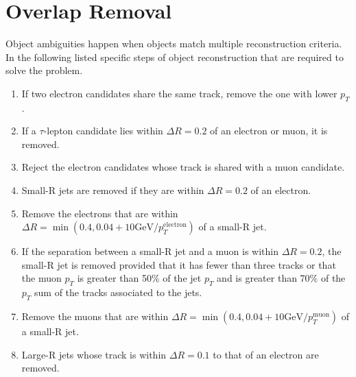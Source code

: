 \documentclass[class=NCU_thesis, crop=false]{standalone}
\begin{document}
\section{Overlap Removal}\label{OR}
	Object ambiguities happen when objects match multiple reconstruction criteria. In the following listed specific steps of object reconstruction that are required to solve the problem.
	\begin{enumerate}
		\item If two electron candidates share the same track, remove the one with lower $p_T$.
		\item If a $\tau$-lepton candidate lies within $\Delta R = 0.2$ of an electron or muon, it is removed.
		\item Reject the electron candidates whose track is shared with a muon candidate.
		\item Small-R jets are removed if they are within $\Delta R = 0.2$ of an electron.
		\item Remove the electrons that are within $\Delta R = \min(0.4, 0.04 + 10 \mathrm{GeV} / p_T^{\mathrm{electron}})$ of a small-R jet.
		\item If the separation between a small-R jet and a muon is within $\Delta R = 0.2$, the small-R jet is removed provided that it has fewer than three tracks or that the muon $p_T$ is greater than 50\% of the jet $p_T$ and is greater than 70\% of the $p_T$ sum of the tracks associated to the jets.
		\item Remove the muons that are within $\Delta R = \min(0.4, 0.04 + 10 \mathrm{GeV} / p_T^{\mathrm{muon}})$ of a small-R jet.
		\item Large-R jets whose track is within $\Delta R = 0.1$ to that of an electron are removed.
	\end{enumerate}
\end{document}
